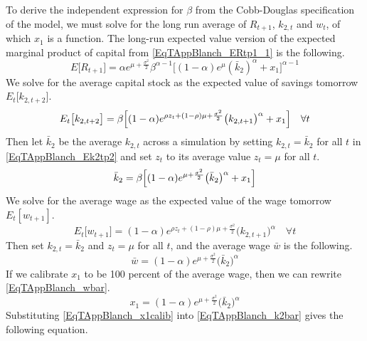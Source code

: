 \documentclass[letterpaper,12pt]{article}
\theoremstyle{definition}
\begin{document}
    To derive the independent expression for $\beta$ from the Cobb-Douglas specification of the model, we must solve for the long run average of $R_{t+1}$, $k_{2,t}$ and $w_t$, of which $x_1$ is a function. The long-run expected value version of the expected marginal product of capital from \eqref{EqTAppBlanch_ERtp1_1} is the following.
    \begin{equation}\label{EqTAppBlanch_ERtp1_1bar}
      E\bigl[R_{t+1}\bigr] = \alpha e^{\mu + \frac{\sigma^2}{2}}\beta^{\alpha-1}\bigl[(1-\alpha)e^\mu(\bar{k}_2)^\alpha + x_1\bigr]^{\alpha-1}
    \end{equation}
    We solve for the average capital stock as the expected value of savings tomorrow $E_t\bigl[k_{2,t+2}\bigr]$.
    \begin{equation}\label{EqTAppBlanch_Ek2tp2}
      E_t\bigl[k_{2,t+2}\bigr] = \beta\Bigl[(1-\alpha)e^{\rho z_t + (1-\rho)\mu + \frac{\sigma^2}{2}}\bigl(k_{2,t+1}\bigr)^\alpha + x_1\Bigr] \quad\forall t
    \end{equation}
    Then let $\bar{k}_2$ be the average $k_{2,t}$ across a simulation by setting $k_{2,t}=\bar{k}_2$ for all $t$ in \eqref{EqTAppBlanch_Ek2tp2} and set $z_t$ to its average value $z_t=\mu$ for all $t$.
    \begin{equation}\label{EqTAppBlanch_k2bar}
      \bar{k}_2 = \beta\Bigl[(1-\alpha)e^{\mu + \frac{\sigma^2}{2}}\bigl(\bar{k}_2\bigr)^\alpha + x_1\Bigr]
    \end{equation}
    We solve for the average wage as the expected value of the wage tomorrow $E_t[w_{t+1}]$.
    \begin{equation}\label{EqTAppBlanch_Ewtp1}
      E_t\bigl[w_{t+1}\bigr] = (1-\alpha)e^{\rho z_t + (1-\rho)\mu + \frac{\sigma^2}{2}}\bigl(k_{2,t+1}\bigr)^\alpha \quad\forall t
    \end{equation}
    Then set $k_{2,t}=\bar{k}_2$ and $z_t=\mu$ for all $t$, and the average wage $\bar{w}$ is the following.
    \begin{equation}\label{EqTAppBlanch_wbar}
      \bar{w} = (1-\alpha)e^{\mu + \frac{\sigma^2}{2}}\bigl(\bar{k}_2\bigr)^\alpha
    \end{equation}
    If we calibrate $x_1$ to be 100 percent of the average wage, then we can rewrite \eqref{EqTAppBlanch_wbar}.
    \begin{equation}\label{EqTAppBlanch_x1calib}
      x_1 = (1-\alpha)e^{\mu + \frac{\sigma^2}{2}}\bigl(\bar{k}_2\bigr)^\alpha
    \end{equation}
    Substituting \eqref{EqTAppBlanch_x1calib} into \eqref{EqTAppBlanch_k2bar} gives the following equation.
\end{document}
